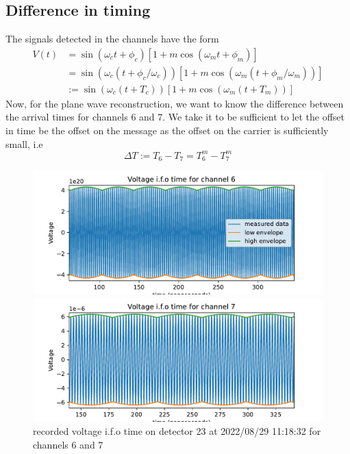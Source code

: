 \documentclass[11pt,a4paper,faculty=we,language=en,doctype=report]{cls/ugent-doc}
\begin{document}
\subsection{Difference in timing}
The signals detected in the channels have the form 
\begin{align}
  V(t) &= \sin(\omega_c t + \phi_c)\left[1 + m\cos(\omega_m t + \phi_m)\right]\\
  &= \sin(\omega_c(t + \phi_c/\omega_c))\left[1 + m\cos(\omega_m( t + \phi_m/\omega_m))\right]\\
  &:= \sin(\omega_c(t + T_c))\left[1 + m\cos(\omega_m( t + T_m))\right]
\end{align}
Now, for the plane wave reconstruction, we want to know the difference between
the arrival times for channels 6 and 7.  We take it to be sufficient to let the
offset in time be the offset on the message as the offset on the carrier is 
sufficiently small, i.e
\begin{equation}
  \Delta T := T_6 - T_7 = T_6^m - T_7^m
\end{equation}
\begin{figure}
	\begin{minipage}{0.49\textwidth}
		\includegraphics[width=\textwidth]{ModulatedCh6.pdf}
	\end{minipage}
	\begin{minipage}{0.49\textwidth}
		\includegraphics[width=\textwidth]{ModulatedCh7.pdf}
	\end{minipage}
	\caption{recorded voltage i.f.o time on detector 23 at 2022/08/29 11:18:32 for
	channels 6 and 7}
	\label{fig:ModulatedChannels}
\end{figure}
\end{document}
